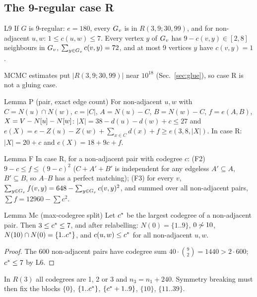 \subsection{The 9-regular case R}\label{sec:caseR}
\begin{namedthm}{L9}
If $G$ is 9-regular: $e = 180$, every $G_{v}$ is in $R(3,9;30,99)$, and for non-adjacent $u, w$: $1 \le c(u,w) \le 7$.
Every vertex $y$ of $G_{v}$ has $9 - c(v,y) \in [2,8]$ neighbours in $G_{v}$, $\sum_{y \in G_{v}} c(v,y) = 72$, and at most 9 vertices
$y$ have $c(v,y) = 1$.
\end{namedthm}
MCMC estimates put $|R(3,9;30,99)|$ near $10^{18}$ (Sec.~\ref{sec:glue}), so case R is not a gluing case.

\begin{namedthm}{Lemma P (pair, exact edge count)}
For non-adjacent $u, w$ with $C = N(u) \cap N(w)$, $c = |C|$, $A = N(u) - C$,
$B = N(w) - C$, $f = e(A,B)$, $X = V - N[u] - N[w]$:
$|X| = 38 - d(u) - d(w) + c \le 27$ and $e(X) = e - Z(u) - Z(w) + \sum_{x \in C} d(x) + f \ge e(3,8,|X|)$.
In case R: $|X| = 20 + c$ and $e(X) = 18 + 9c + f$.
\end{namedthm}

\begin{namedthm}{Lemma F}
In case R, for a non-adjacent pair with codegree $c$:
(F2) $9 - c \le f \le (9 - c)^2$ ($C + A' + B'$ is independent for any edgeless $A' \subseteq A$, $B' \subseteq B$, so $A$--$B$ has a
perfect matching); (F3) for every $v$, $\sum_{y \in G_{v}} f(v,y) = 648 - \sum_{y \in G_{v}} c(v,y)^2$, and summed over all
non-adjacent pairs, $\sum f = 12960 - \sum c^2$.
\end{namedthm}

\begin{namedthm}{Lemma Mc (max-codegree split)}
Let $c^{*}$ be the largest codegree of a non-adjacent pair. Then $3 \le c^{*} \le 7$, and
after relabelling: $N(0) = \{1..9\}$, $0 \not\sim 10$, $N(10) \cap N(0) = \{1..c^{*}\}$, and $c(u,w) \le c^{*}$ for all non-adjacent $u, w$.
\end{namedthm}
\begin{proof}
The 600 non-adjacent pairs have codegree sum $40 \cdot \binom{9}{2} = 1440 > 2 \cdot 600$; $c^{*} \le 7$ by L6.
\end{proof}
In $R(3)$ all codegrees are 1, 2 or 3 and $n_3 = n_1 + 240$. 
Symmetry breaking must then fix the blocks $\{0\}$, $\{1..c^{*}\}$, $\{c^{*}+1..9\}$, $\{10\}$, $\{11..39\}$.

